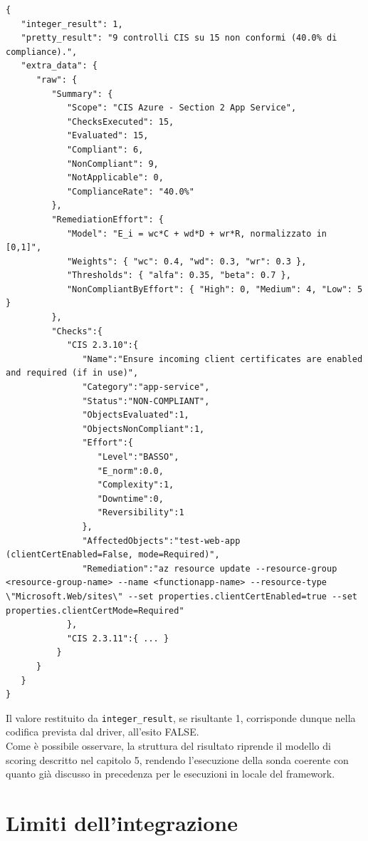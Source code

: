 \documentclass[a4paper,11pt]{report}
\begin{document}
\begin{lstlisting}[style=azcli, caption={Estratto output prodotto dall'esecuzione di una sonda. Per semplicità il blocco Checks riporta solo il primo esito in questa estrazione.}, label={lst:output-example}]
{
   "integer_result": 1,
   "pretty_result": "9 controlli CIS su 15 non conformi (40.0% di compliance).",
   "extra_data": {
      "raw": {
         "Summary": {
            "Scope": "CIS Azure - Section 2 App Service",
            "ChecksExecuted": 15,
            "Evaluated": 15,
            "Compliant": 6,
            "NonCompliant": 9,
            "NotApplicable": 0,
            "ComplianceRate": "40.0%"
         },
         "RemediationEffort": {
            "Model": "E_i = wc*C + wd*D + wr*R, normalizzato in [0,1]",
            "Weights": { "wc": 0.4, "wd": 0.3, "wr": 0.3 },
            "Thresholds": { "alfa": 0.35, "beta": 0.7 },
            "NonCompliantByEffort": { "High": 0, "Medium": 4, "Low": 5 }
         },
         "Checks":{
            "CIS 2.3.10":{
               "Name":"Ensure incoming client certificates are enabled and required (if in use)",
               "Category":"app-service",
               "Status":"NON-COMPLIANT",
               "ObjectsEvaluated":1,
               "ObjectsNonCompliant":1,
               "Effort":{
                  "Level":"BASSO",
                  "E_norm":0.0,
                  "Complexity":1,
                  "Downtime":0,
                  "Reversibility":1
               },
               "AffectedObjects":"test-web-app (clientCertEnabled=False, mode=Required)",
               "Remediation":"az resource update --resource-group <resource-group-name> --name <functionapp-name> --resource-type \"Microsoft.Web/sites\" --set properties.clientCertEnabled=true --set properties.clientCertMode=Required"
            },
            "CIS 2.3.11":{ ... }
          }
      }
   }
}
\end{lstlisting}


Il valore restituito da \texttt{integer\_result}, se risultante 1, corrisponde dunque nella codifica prevista dal driver, all'esito FALSE.\\
Come è possibile osservare, la struttura del risultato riprende il modello di scoring descritto nel capitolo 5, rendendo l'esecuzione della sonda coerente con quanto già discusso in precedenza per le esecuzioni in locale del framework.


\section{Limiti dell'integrazione}
\end{document}

